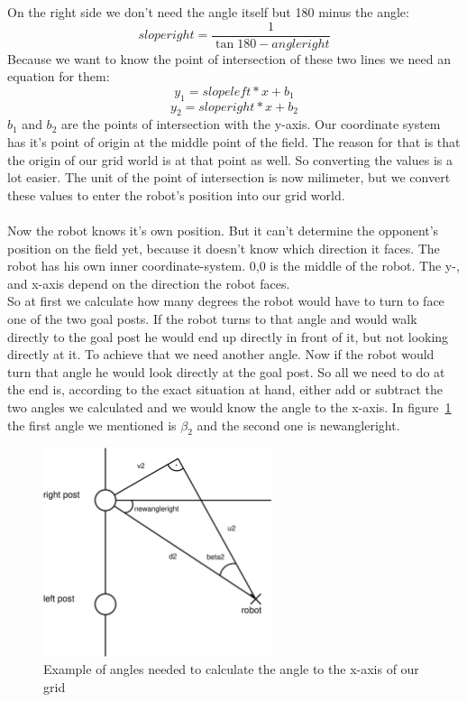 \documentclass[lnicst,a4paper]{svmultln}
\begin{document}
On the right side we don't need the angle itself but 180 minus the angle:
\begin{equation}
	sloperight = \frac{1}{\tan{180 - angleright}}
	\label{equ:sloperight}
\end{equation}
Because we want to know the point of intersection of these two lines we need an equation for them:
\begin{equation}
	y_{1} = slopeleft * x + b_{1}
\end{equation}
\begin{equation}
	y_{2} = sloperight * x + b_{2}
\end{equation}
\(b_{1}\) and \(b_{2}\) are the points of intersection with the y-axis. Our coordinate system has it's point of origin at the middle point of the field. The reason for that is that the origin of our grid world is at that point as well. So converting the values is a lot easier. The unit of the point of intersection is now milimeter, but we convert these values to enter the robot's position into our grid world.
\\
\\
Now the robot knows it's own position. But it can't determine the opponent's position on the field yet, because it doesn't know which direction it faces. The robot has his own inner coordinate-system. 0,0 is the middle of the robot. The y-, and x-axis depend on the direction the robot faces.\\
So at first we calculate how many degrees the robot would have to turn to face one of the two goal posts. If the robot turns to that angle and would walk directly to the goal post he would end up directly in front of it, but not looking directly at it. To achieve that we need another angle. Now if the robot would turn that angle he would look directly at the goal post. So all we need to do at the end is, according to the exact situation at hand, either add or subtract the two angles we calculated and we would know the angle to the x-axis.
In figure~\ref{fig:angles} the first angle we mentioned is \(\beta_{2}\) and the second one is newangleright.
\begin{figure}
 	\centerline{\includegraphics[width=0.6\textwidth]{angles.pdf}}
	{\caption{Example of angles needed to calculate the angle to the x-axis of our grid}\label{fig:angles}}
\end{figure}
\end{document}
